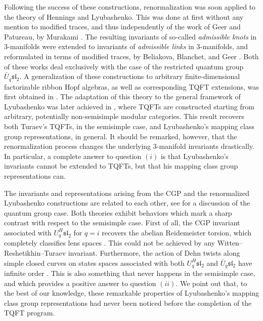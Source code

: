 \documentclass[a4paper,reqno]{amsart}
\theoremstyle{definition}
\theoremstyle{remark}
\newcommand{\fsl}{\mathfrak{sl}}
\begin{document}
Following the success of these constructions, renormalization was soon applied to the theory of Hennings and Lyubashenko. This was done at first without any mention to modified traces, and thus independently of the work of Geer and Patureau, by Murakami \cite{M13}. The resulting invariants of so-called \textit{admissible knots} in 3-manifolds were extended to invariants of \textit{admissible links} in 3-manifolds, and reformulated in terms of modified traces, by Beliakova, Blanchet, and Geer \cite{BBG17}. Both of these works deal exclusively with the case of the restricted quantum group $\bar{U}_q \fsl_2$. A generalization of these constructions to arbitrary finite-dimensional factorizable ribbon Hopf algebras, as well as corresponding TQFT extensions, was first obtained in \cite{DGP17}. The adaptation of this theory to the general framework of Lyubashenko was later achieved in \cite{DGGPR19}, where TQFTs are constructed starting from arbitrary, potentially non-semisimple modular categories. This result recovers both Turaev's TQFTs, in the semisimple case, and Lyubashenko's mapping class group representations, in general. It should be remarked, however, that the renormalization process changes the underlying 3-manifold invariants drastically. In particular, a complete answer to question $(i)$ is that Lyubashenko's invariants cannot be extended to TQFTs, but that his mapping class group representations can.

The invariants and representations arising from the CGP and the renormalized Lyubashenko constructions are related to each other, see \cite{DGP18} for a discussion of the quantum group case. Both theories exhibit behaviors which mark a sharp contrast with respect to the semisimple case. First of all, the CGP invariant associated with $U^H_q \fsl_2$ for $q=i$ recovers the abelian Reidemeister torsion, which completely classifies lens spaces \cite{BCGP14}. This could not be achieved by any Witten--Reshetikhin--Turaev invariant. Furthermore, the action of Dehn twists along simple closed curves on states spaces associated with both $U^H_q \fsl_2$ and $\bar{U}_q \fsl_2$ have infinite order \cite{BCGP14,DGGPR20}. This is also something that never happens in the semisimple case, and which provides a positive answer to question $(ii)$. We point out that, to the best of our knowledge, these remarkable properties of Lyubashenko's mapping class group representations had never been noticed before the completion of the TQFT program.
\end{document}
